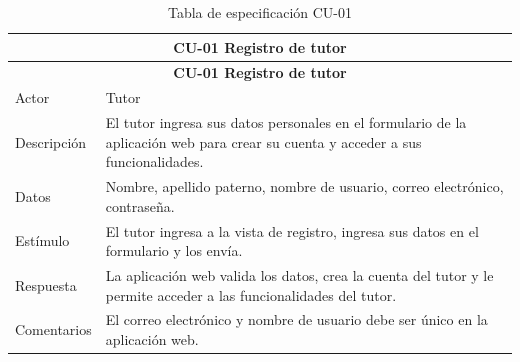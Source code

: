 \begin{longtable}{|p{4cm}|p{11cm}|}
\caption{Tabla de especificación CU-01}
\label{tab:cu01} \\

\hline
\multicolumn{2}{|c|}{\textbf{CU-01 Registro de tutor}} \\
\hline
\endfirsthead

\hline
\multicolumn{2}{|c|}{\textbf{CU-01 Registro de tutor}} \\
\hline
\endhead

\hline
\endfoot
\endlastfoot

Actor & Tutor \\
\hline

Descripción & El tutor ingresa sus datos personales en el formulario de la aplicación web para crear su cuenta y acceder a sus funcionalidades. \\
\hline

Datos & Nombre, apellido paterno, nombre de usuario, correo electrónico, contraseña. \\
\hline

Estímulo & El tutor ingresa a la vista de registro, ingresa sus datos en el formulario y los envía. \\
\hline

Respuesta & La aplicación web valida los datos, crea la cuenta del tutor y le permite acceder a las funcionalidades del tutor. \\
\hline

Comentarios & El correo electrónico y nombre de usuario debe ser único en la aplicación web. \\
\hline

\end{longtable}

